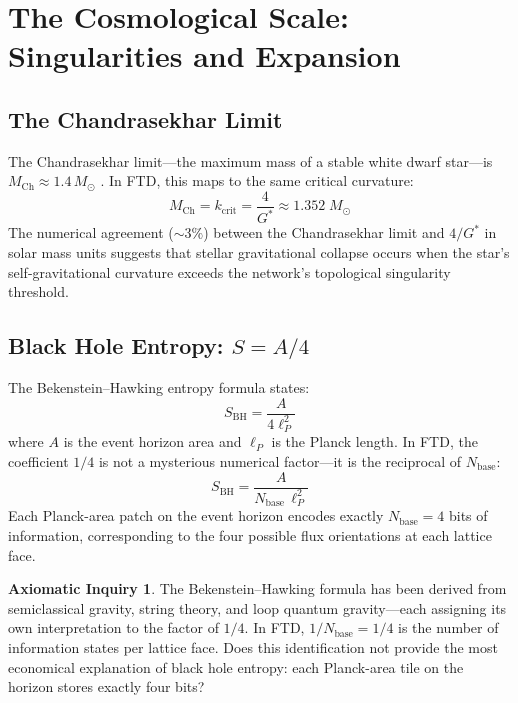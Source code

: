 \documentclass[11pt, letterpaper]{article}
\newcommand{\G}{G^*}
\theoremstyle{definition}
\newtheorem{inquiry}{Axiomatic Inquiry}[section]
\theoremstyle{remark}
\begin{document}
\section{The Cosmological Scale: Singularities and Expansion}

\subsection{The Chandrasekhar Limit}

The Chandrasekhar limit---the maximum mass of a stable white dwarf star---is $M_{\text{Ch}} \approx 1.4\,M_\odot$ \cite{Chandrasekhar1931}. In FTD, this maps to the same critical curvature:
\begin{equation}
    M_{\text{Ch}} = k_{\text{crit}} = \frac{4}{\G} \approx \mathbf{1.352}\;M_\odot
\end{equation}
The numerical agreement ($\sim 3\%$) between the Chandrasekhar limit and $4/\G$ in solar mass units suggests that stellar gravitational collapse occurs when the star's self-gravitational curvature exceeds the network's topological singularity threshold.

\subsection{Black Hole Entropy: $S = A/4$}

The Bekenstein--Hawking entropy formula \cite{Hawking1975} states:
\begin{equation}
    S_{\text{BH}} = \frac{A}{4\ell_P^2}
\end{equation}
where $A$ is the event horizon area and $\ell_P$ is the Planck length. In FTD, the coefficient $1/4$ is not a mysterious numerical factor---it is the reciprocal of $N_{\text{base}}$:
\begin{equation}
    S_{\text{BH}} = \frac{A}{N_{\text{base}}\,\ell_P^2}
\end{equation}
Each Planck-area patch on the event horizon encodes exactly $N_{\text{base}} = 4$ bits of information, corresponding to the four possible flux orientations at each lattice face.

\begin{inquiry}
The Bekenstein--Hawking formula has been derived from semiclassical gravity, string theory, and loop quantum gravity---each assigning its own interpretation to the factor of $1/4$. In FTD, $1/N_{\text{base}} = 1/4$ is the number of information states per lattice face. Does this identification not provide the most economical explanation of black hole entropy: each Planck-area tile on the horizon stores exactly four bits?
\end{inquiry}
\end{document}
